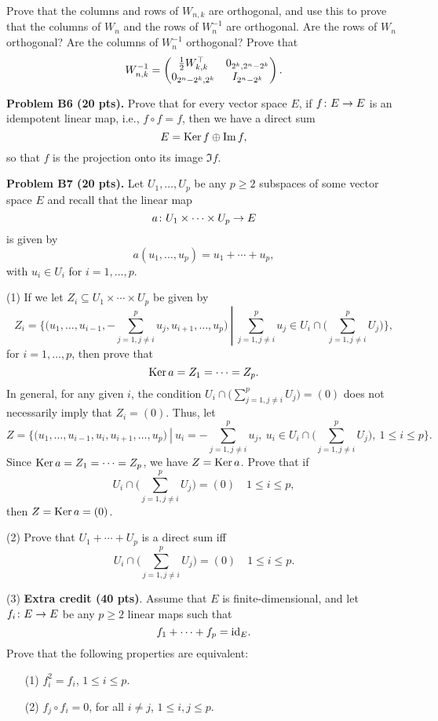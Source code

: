 \documentclass[12pt]{article}
\begin{document}
\medskip
Prove that the columns and rows of $W_{n, k}$ are orthogonal, and use
this to prove that the columns of $W_n$ and the rows of
$W_n^{-1}$ are orthogonal. 
Are the rows of  $W_n$ orthogonal?
Are the columns of  $W_n^{-1}$ orthogonal?
Prove that
\[
W_{n, k}^{-1} = 
\begin{pmatrix}
 \frac{1}{2}W_{k, k}^{\top} & 0_{2^{k}, 2^{n} - 2^{k}} \\
0_{2^{n}- 2^{k}, 2^k} &  I_{2^{n} - 2^{k}}
\end{pmatrix}.
\]


\vspace {0.25cm}\noindent
{\bf Problem B6 (20 pts).}
Prove that 
for every vector space $E$, if $f\colon E\rightarrow E$ is an idempotent
linear map, i.e., $f\circ f = f$, then we have a direct sum
\[
E = {\rm Ker}\,{f} \oplus {\rm Im}\,{f},
\]
so that $f$ is the projection onto its image $\Im{f}$.


\vspace {0.25cm}\noindent
{\bf Problem B7 (20 pts).}
Let $U_1, \ldots, U_p$ be any  $p \geq 2$  subspaces of some vector
space $E$ and recall that the linear map
\[
a\colon U_1\times \cdots \times U_p\rightarrow E
\]
is given by
\[
a(u_1, \ldots, u_p) = u_1 + \cdots + u_p,
\]
with $u_i \in U_i$ for $i = 1, \ldots, p$.

\medskip
(1)
If we let $Z_i \subseteq U_1\times \cdots \times U_p$ be given by
\[
Z_i = \left.\bigg\{\Big(u_1, \ldots, u_{i - 1}, -\sum_{j = 1, j \not= i}^p u_j, u_{i + 1}, 
\ldots, u_p\Big) \>\right|\> \sum_{j = 1, j \not= i}^p u_j  \in  
U_i \cap \bigg(\sum_{j = 1, j \not= i}^p U_j \bigg) 
\bigg\},
\]
for $i = 1, \ldots, p$, then prove that
\[
{\rm Ker}\,{a} = Z_1 = \cdots =   Z_p.
\]
In general, for any given $i$, the condition
$U_i \cap \bigg(\sum_{j = 1, j \not= i}^p U_j \bigg) =
(0)$ does not necessarily imply that $Z_i = (0)$.
Thus, let 
\[
Z = \left.\bigg\{\Big(u_1, \ldots, u_{i - 1}, u_i, u_{i + 1}, 
\ldots, u_p\Big) \>\right|\> u_i =  -\sum_{j = 1, j \not= i}^p u_j, \>
u_i   \in  
U_i \cap \bigg(\sum_{j = 1, j \not= i}^p U_j \bigg), \> 1\leq i \leq p 
\bigg\}.
\]
Since ${\rm Ker}\,{a} = Z_1 = \cdots =  Z_p$, we have $Z = {\rm Ker}\, a$.
Prove that if
\[
U_i \cap \bigg(\sum_{j = 1, j \not= i}^p U_j \bigg) = (0)
\quad 1 \leq i \leq p,
\]
then $Z = {\rm Ker}\, a = (0)$.

\medskip
(2)
Prove that $U_1 + \cdots + U_p$ is a direct sum iff
\[
U_i \cap \bigg(\sum_{j = 1, j \not= i}^p U_j \bigg) = (0)
\quad 1 \leq i \leq p.
\]


\medskip\noindent
(3)
{\bf Extra credit (40 pts)\/}.
Assume that $E$ is finite-dimensional, and
let $f_i\colon E\rightarrow E$ be any 
$p\geq 2$ linear maps such that
\[
f_1 + \cdots + f_p  = {\rm id}_E.
\]
Prove that the following properties are equivalent:
\begin{enumerate}
\item[(1)]
$f_i^2 = f_i$, $1\leq i \leq p$.
\item[(2)]
$f_j \circ f_i =  0$, for all $i \not= j$, $1\leq i, j \leq p$.
\end{enumerate}
\end{document}
